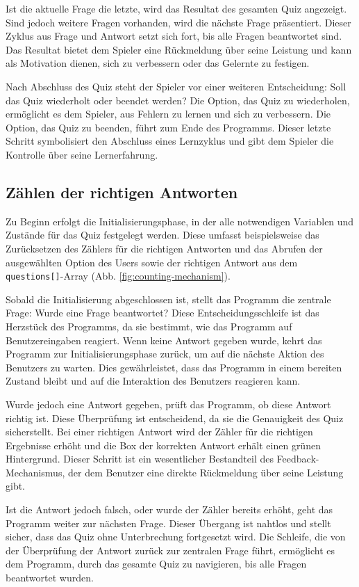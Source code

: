 \documentclass[10pt, fleqn]{scrartcl}
\begin{document}
Ist die aktuelle Frage die letzte, wird das Resultat des gesamten Quiz angezeigt. Sind jedoch weitere Fragen vorhanden, wird die nächste Frage präsentiert. Dieser Zyklus aus Frage und Antwort setzt sich fort, bis alle Fragen beantwortet sind. Das Resultat bietet dem Spieler eine Rückmeldung über seine Leistung und kann als Motivation dienen, sich zu verbessern oder das Gelernte zu festigen.

Nach Abschluss des Quiz steht der Spieler vor einer weiteren Entscheidung: Soll das Quiz wiederholt oder beendet werden? Die Option, das Quiz zu wiederholen, ermöglicht es dem Spieler, aus Fehlern zu lernen und sich zu verbessern. Die Option, das Quiz zu beenden, führt zum Ende des Programms. Dieser letzte Schritt symbolisiert den Abschluss eines Lernzyklus und gibt dem Spieler die Kontrolle über seine Lernerfahrung.

\subsection{Zählen der richtigen Antworten}

Zu Beginn erfolgt die Initialisierungsphase, in der alle notwendigen Variablen und Zustände für das Quiz festgelegt werden. Diese umfasst beispielsweise das Zurücksetzen des Zählers für die richtigen Antworten und das Abrufen der ausgewählten Option des Users sowie der richtigen Antwort aus dem \texttt{questions[]}-Array (Abb. \ref{fig:counting-mechanism}).

Sobald die Initialisierung abgeschlossen ist, stellt das Programm die zentrale Frage: Wurde eine Frage beantwortet? Diese Entscheidungsschleife ist das Herzstück des Programms, da sie bestimmt, wie das Programm auf Benutzereingaben reagiert. Wenn keine Antwort gegeben wurde, kehrt das Programm zur Initialisierungsphase zurück, um auf die nächste Aktion des Benutzers zu warten. Dies gewährleistet, dass das Programm in einem bereiten Zustand bleibt und auf die Interaktion des Benutzers reagieren kann.

Wurde jedoch eine Antwort gegeben, prüft das Programm, ob diese Antwort richtig ist. Diese Überprüfung ist entscheidend, da sie die Genauigkeit des Quiz sicherstellt. Bei einer richtigen Antwort wird der Zähler für die richtigen Ergebnisse erhöht und die Box der korrekten Antwort erhält einen grünen Hintergrund. Dieser Schritt ist ein wesentlicher Bestandteil des Feedback-Mechanismus, der dem Benutzer eine direkte Rückmeldung über seine Leistung gibt.

Ist die Antwort jedoch falsch, oder wurde der Zähler bereits erhöht, geht das Programm weiter zur nächsten Frage. Dieser Übergang ist nahtlos und stellt sicher, dass das Quiz ohne Unterbrechung fortgesetzt wird. Die Schleife, die von der Überprüfung der Antwort zurück zur zentralen Frage führt, ermöglicht es dem Programm, durch das gesamte Quiz zu navigieren, bis alle Fragen beantwortet wurden.
\end{document}
